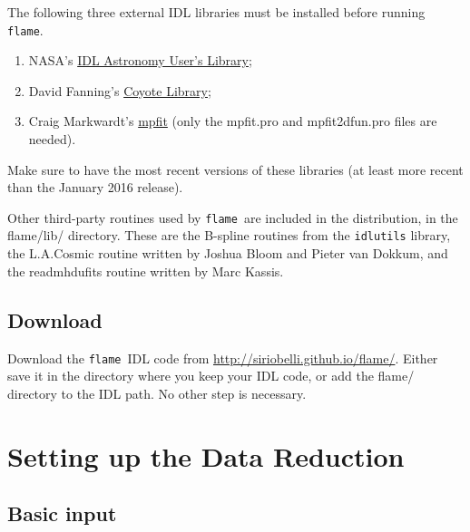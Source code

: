 \documentclass[a4paper, notitlepage]{article}
\newcommand{\flame}{\texttt{flame}}
\begin{document}
The following three external IDL libraries must be installed before running \flame.
\begin{enumerate}
\item NASA's \href{http://idlastro.gsfc.nasa.gov/}{IDL Astronomy User's Library};
\item David Fanning's \href{http://www.idlcoyote.com/code_tips/installcoyote.php}{Coyote Library};
\item Craig Markwardt's \href{https://www.physics.wisc.edu/~craigm/idl/fitting.html}{mpfit} (only the mpfit.pro and mpfit2dfun.pro files are needed).
\end{enumerate}
Make sure to have the most recent versions of these libraries (at least more recent than the January 2016 release).

Other third-party routines used by \flame\ are included in the distribution, in the flame/lib/ directory. These are the B-spline routines from the \texttt{idlutils} library, the L.A.Cosmic routine written by Joshua Bloom and Pieter van Dokkum, and the readmhdufits routine written by Marc Kassis.


\subsection{Download}

Download the \flame\ IDL code from \url{http://siriobelli.github.io/flame/}. Either save it in the directory where you keep your IDL code, or add the flame/ directory to the IDL path. No other step is necessary.







\newpage

\section{Setting up the Data Reduction}
\label{sec:setup}


\subsection{Basic input}
\end{document}

